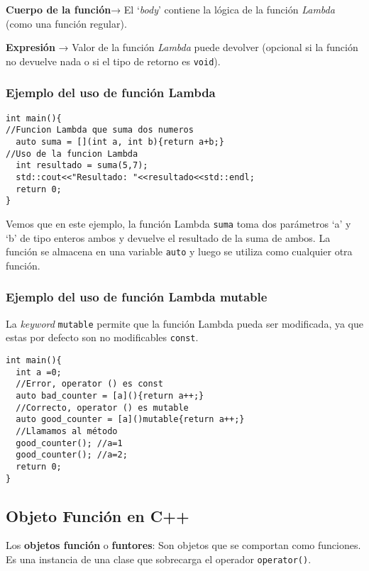 \textbf{Cuerpo de la función}→ El ‘\textit{body}’ contiene la lógica de la función \textit{Lambda} (como una función regular).

\textbf{Expresión} → Valor de la función \textit{Lambda} puede devolver (opcional si la función no devuelve nada o si el tipo de retorno es \texttt{void}).


\subsubsection{Ejemplo del uso de función Lambda}
\begin{center}
	\begin{lstlisting}[frame=single]
int main(){
//Funcion Lambda que suma dos numeros
  auto suma = [](int a, int b){return a+b;}
//Uso de la funcion Lambda
  int resultado = suma(5,7);
  std::cout<<"Resultado: "<<resultado<<std::endl;
  return 0;
}
	\end{lstlisting}
\end{center}
Vemos que en este ejemplo, la función Lambda \texttt{suma} toma dos parámetros ‘a’ y ‘b’ de tipo enteros ambos y devuelve el resultado de la suma de ambos.
La función se almacena en una variable \texttt{auto} y luego se utiliza como cualquier otra función.

\subsubsection{Ejemplo del uso de función Lambda mutable}
La \textit{keyword} \texttt{mutable} permite que la función Lambda pueda ser modificada, ya que estas por defecto son no modificables \texttt{const}. 
\begin{center}
	\begin{lstlisting}[frame=single]
int main(){
  int a =0;
  //Error, operator () es const
  auto bad_counter = [a](){return a++;} 
  //Correcto, operator () es mutable
  auto good_counter = [a]()mutable{return a++;}
  //Llamamos al método
  good_counter(); //a=1
  good_counter(); //a=2;
  return 0;
}
	\end{lstlisting}
\end{center}

\subsection{Objeto Función en C++}
Los \textbf{objetos función} o \textbf{funtores}: Son objetos que se comportan como funciones. Es una instancia de una clase que sobrecarga el operador \texttt{operator()}. 

